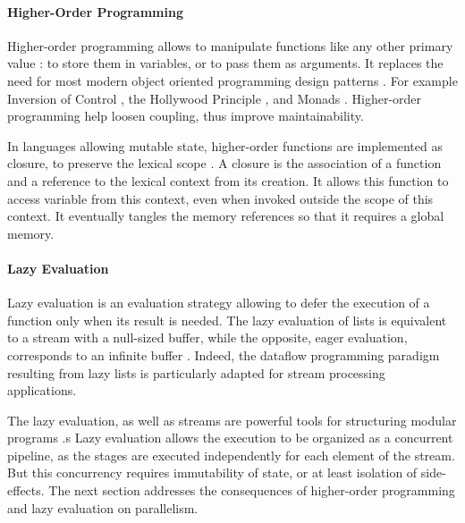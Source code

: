 \paragraph{Higher-Order Programming}

Higher-order programming allows to manipulate functions like any other primary value : to store them in variables, or to pass them as arguments.
It replaces the need for most modern object oriented programming design patterns .
For example Inversion of Control \cite{Johnson}, the Hollywood Principle \cite{Sweet1985}, and Monads \cite{Wadler1992}.
Higher-order programming help loosen coupling, thus improve maintainability.

In languages allowing mutable state, higher-order functions are implemented as closure, to preserve the lexical scope \cite{Sussman1998}.
A closure is the association of a function and a reference to the lexical context from its creation.
It allows this function to access variable from this context, even when invoked outside the scope of this context.
It eventually tangles the memory references so that it requires a global memory.

\paragraph{Lazy Evaluation}

Lazy evaluation is an evaluation strategy allowing to defer the execution of a function only when its result is needed.
The lazy evaluation of lists is equivalent to a stream with a null-sized buffer, while the opposite, eager evaluation, corresponds to an infinite buffer \cite{VanRoy2003}.
Indeed, the dataflow programming paradigm resulting from lazy lists is particularly adapted for stream processing applications.

The lazy evaluation, as well as streams are powerful tools for structuring modular programs \cite{Sussman1983}.s
Lazy evaluation allows the execution to be organized as a concurrent pipeline, as the stages are executed independently for each element of the stream.
But this concurrency requires immutability of state, or at least isolation of side-effects.
The next section addresses the consequences of higher-order programming and lazy evaluation on parallelism.

